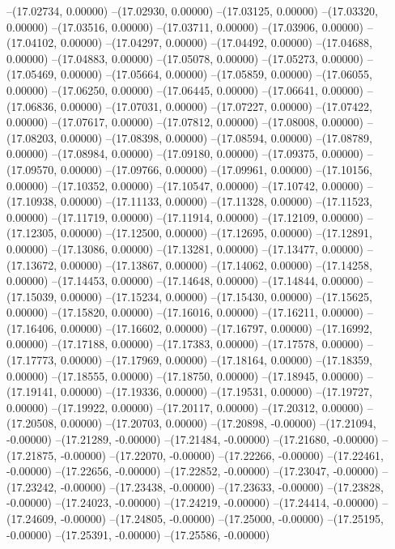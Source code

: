 --(17.02734, 0.00000)
--(17.02930, 0.00000)
--(17.03125, 0.00000)
--(17.03320, 0.00000)
--(17.03516, 0.00000)
--(17.03711, 0.00000)
--(17.03906, 0.00000)
--(17.04102, 0.00000)
--(17.04297, 0.00000)
--(17.04492, 0.00000)
--(17.04688, 0.00000)
--(17.04883, 0.00000)
--(17.05078, 0.00000)
--(17.05273, 0.00000)
--(17.05469, 0.00000)
--(17.05664, 0.00000)
--(17.05859, 0.00000)
--(17.06055, 0.00000)
--(17.06250, 0.00000)
--(17.06445, 0.00000)
--(17.06641, 0.00000)
--(17.06836, 0.00000)
--(17.07031, 0.00000)
--(17.07227, 0.00000)
--(17.07422, 0.00000)
--(17.07617, 0.00000)
--(17.07812, 0.00000)
--(17.08008, 0.00000)
--(17.08203, 0.00000)
--(17.08398, 0.00000)
--(17.08594, 0.00000)
--(17.08789, 0.00000)
--(17.08984, 0.00000)
--(17.09180, 0.00000)
--(17.09375, 0.00000)
--(17.09570, 0.00000)
--(17.09766, 0.00000)
--(17.09961, 0.00000)
--(17.10156, 0.00000)
--(17.10352, 0.00000)
--(17.10547, 0.00000)
--(17.10742, 0.00000)
--(17.10938, 0.00000)
--(17.11133, 0.00000)
--(17.11328, 0.00000)
--(17.11523, 0.00000)
--(17.11719, 0.00000)
--(17.11914, 0.00000)
--(17.12109, 0.00000)
--(17.12305, 0.00000)
--(17.12500, 0.00000)
--(17.12695, 0.00000)
--(17.12891, 0.00000)
--(17.13086, 0.00000)
--(17.13281, 0.00000)
--(17.13477, 0.00000)
--(17.13672, 0.00000)
--(17.13867, 0.00000)
--(17.14062, 0.00000)
--(17.14258, 0.00000)
--(17.14453, 0.00000)
--(17.14648, 0.00000)
--(17.14844, 0.00000)
--(17.15039, 0.00000)
--(17.15234, 0.00000)
--(17.15430, 0.00000)
--(17.15625, 0.00000)
--(17.15820, 0.00000)
--(17.16016, 0.00000)
--(17.16211, 0.00000)
--(17.16406, 0.00000)
--(17.16602, 0.00000)
--(17.16797, 0.00000)
--(17.16992, 0.00000)
--(17.17188, 0.00000)
--(17.17383, 0.00000)
--(17.17578, 0.00000)
--(17.17773, 0.00000)
--(17.17969, 0.00000)
--(17.18164, 0.00000)
--(17.18359, 0.00000)
--(17.18555, 0.00000)
--(17.18750, 0.00000)
--(17.18945, 0.00000)
--(17.19141, 0.00000)
--(17.19336, 0.00000)
--(17.19531, 0.00000)
--(17.19727, 0.00000)
--(17.19922, 0.00000)
--(17.20117, 0.00000)
--(17.20312, 0.00000)
--(17.20508, 0.00000)
--(17.20703, 0.00000)
--(17.20898, -0.00000)
--(17.21094, -0.00000)
--(17.21289, -0.00000)
--(17.21484, -0.00000)
--(17.21680, -0.00000)
--(17.21875, -0.00000)
--(17.22070, -0.00000)
--(17.22266, -0.00000)
--(17.22461, -0.00000)
--(17.22656, -0.00000)
--(17.22852, -0.00000)
--(17.23047, -0.00000)
--(17.23242, -0.00000)
--(17.23438, -0.00000)
--(17.23633, -0.00000)
--(17.23828, -0.00000)
--(17.24023, -0.00000)
--(17.24219, -0.00000)
--(17.24414, -0.00000)
--(17.24609, -0.00000)
--(17.24805, -0.00000)
--(17.25000, -0.00000)
--(17.25195, -0.00000)
--(17.25391, -0.00000)
--(17.25586, -0.00000)

